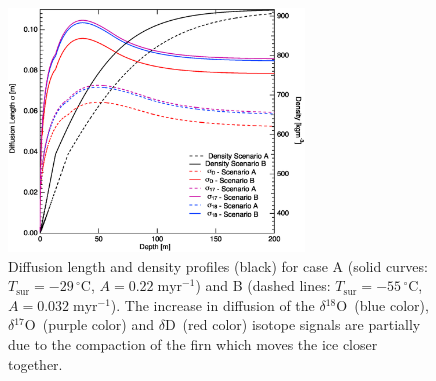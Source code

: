 \documentclass[11pt, draftcls, onecolumn]{IEEEtran} %
\numberwithin{equation}{section}
\numberwithin{table}{section}
\numberwithin{figure}{section}
\newcommand{\delOx}{$\delta{}^{18}\mathrm{O}$}
\newcommand{\delOxb}{$\delta{}^{17}\mathrm{O}$}
\newcommand{\delD}{$\delta\mathrm{D}$}
\begin{document}
\begin{figure}[]	
\vspace*{2mm}
	\begin{center}
			\includegraphics[width=0.7\textwidth]{Figure_1}
			\caption{Diffusion length and density profiles (black) for case A (solid curves: $T_{\mathrm{sur}} = -29 \,^{\circ} \mathrm{C}$,
				 $A = 0.22 \;\mathrm{myr^{-1}}$) and B (dashed lines: $T_{\mathrm{sur}} = -55 \,^{\circ} \mathrm{C}$,
				$A = 0.032 \;\mathrm{myr^{-1}}$). 
				The increase in diffusion of the \delOx~(blue color), \delOxb~(purple color) and \delD~(red color) isotope signals are
				partially due to the compaction of the firn which moves the ice closer together. } 		
	\label{fig:diffusion_length_profiles}		
		\end{center}

\end{figure}

\end{document}
